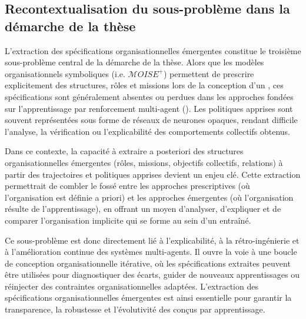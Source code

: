 \subsection*{Recontextualisation du sous-problème dans la démarche de la thèse}

L’extraction des spécifications organisationnelles émergentes constitue le troisième sous-problème central de la démarche de la thèse. Alors que les modèles organisationnels symboliques (i.e. $\mathcal{M}OISE^+$) permettent de prescrire explicitement des structures, rôles et missions lors de la conception d’un , ces spécifications sont généralement absentes ou perdues dans les approches fondées sur l’apprentissage par renforcement multi-agent (). Les politiques apprises sont souvent représentées sous forme de réseaux de neurones opaques, rendant difficile l’analyse, la vérification ou l’explicabilité des comportements collectifs obtenus.

Dans ce contexte, la capacité à extraire a posteriori des structures organisationnelles émergentes (rôles, missions, objectifs collectifs, relations) à partir des trajectoires et politiques apprises devient un enjeu clé. Cette extraction permettrait de combler le fossé entre les approches prescriptives (où l’organisation est définie a priori) et les approches émergentes (où l’organisation résulte de l’apprentissage), en offrant un moyen d’analyser, d’expliquer et de comparer l’organisation implicite qui se forme au sein d’un  entraîné.

Ce sous-problème est donc directement lié à l’explicabilité, à la rétro-ingénierie et à l’amélioration continue des systèmes multi-agents. Il ouvre la voie à une boucle de conception organisationnelle itérative, où les spécifications extraites peuvent être utilisées pour diagnostiquer des écarts, guider de nouveaux apprentissages ou réinjecter des contraintes organisationnelles adaptées. L’extraction des spécifications organisationnelles émergentes est ainsi essentielle pour garantir la transparence, la robustesse et l’évolutivité des  conçus par apprentissage.

